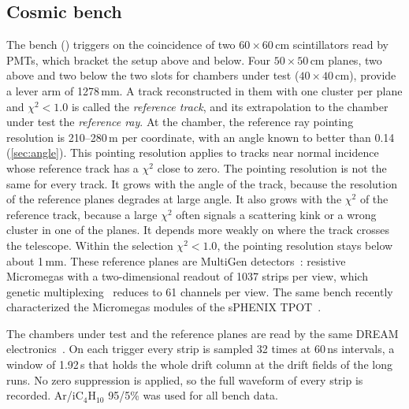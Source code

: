 \subsection{Cosmic bench}
The bench () triggers on the coincidence of two $60\times60$\,cm scintillators read by PMTs, which bracket the setup above and below. Four
$50\times50$\,cm planes, two above and two below the two slots for chambers under test
($40\times40$\,cm), provide a lever arm of 1278\,mm. A track
reconstructed in them with one cluster per plane and $\chi^2<1.0$ is called the \emph{reference track}, and its
extrapolation to the chamber under test the \emph{reference ray}. At the chamber, the reference ray pointing resolution is 210--280\,\textmu m per coordinate, with an angle known to better than 0.14\textdegree{} (\cref{sec:angle}).
This pointing resolution applies to tracks near normal incidence whose reference track has a $\chi^2$ close to zero.
The pointing resolution is not the same for every track. It grows with the angle of the track, because the
resolution of the reference planes degrades at large angle. It also grows with the $\chi^2$ of the reference track,
because a large $\chi^2$ often signals a scattering kink or a wrong cluster in one of the planes. It depends more weakly on
where the track crosses the telescope. Within the selection $\chi^2<1.0$, the pointing resolution stays below about 1\,mm.
These reference planes are MultiGen detectors~\cite{Bouteille2016MultiGen,Radics2019}: resistive Micromegas with a
two-dimensional readout of 1037 strips per view, which genetic multiplexing~\cite{Procureur2013} reduces to 61 channels
per view. The same bench recently characterized the Micromegas modules of the sPHENIX TPOT~\cite{TPOT2024}.

The chambers under test and the reference planes are read by the same DREAM electronics~\cite{Flouzat2014DREAM,Acker2020MVT}. On each trigger every strip
is sampled 32 times at 60\,ns intervals, a window of 1.92\,\textmu s that holds the whole drift column at the
drift fields of the long runs. No zero suppression is applied, so the full waveform of every strip is recorded. Ar/iC$_4$H$_{10}$ 95/5\% was used for all bench data. 

